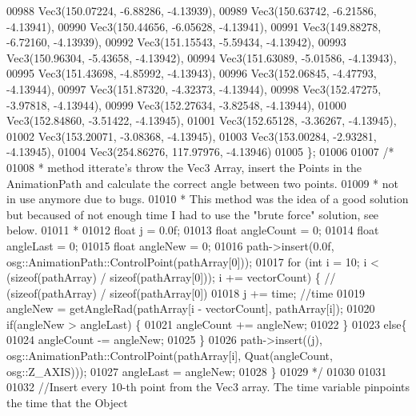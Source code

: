 \begin{DoxyCode}
00988         Vec3(150.07224, -6.88286, -4.13939),
00989         Vec3(150.63742, -6.21586, -4.13941),
00990         Vec3(150.44656, -6.05628, -4.13941),
00991         Vec3(149.88278, -6.72160, -4.13939),
00992         Vec3(151.15543, -5.59434, -4.13942),
00993         Vec3(150.96304, -5.43658, -4.13942),
00994         Vec3(151.63089, -5.01586, -4.13943),
00995         Vec3(151.43698, -4.85992, -4.13943),
00996         Vec3(152.06845, -4.47793, -4.13944),
00997         Vec3(151.87320, -4.32373, -4.13944),
00998         Vec3(152.47275, -3.97818, -4.13944),
00999         Vec3(152.27634, -3.82548, -4.13944),
01000         Vec3(152.84860, -3.51422, -4.13945),
01001         Vec3(152.65128, -3.36267, -4.13945),
01002         Vec3(153.20071, -3.08368, -4.13945),
01003         Vec3(153.00284, -2.93281, -4.13945),
01004         Vec3(254.86276, 117.97976, -4.13946)
01005     \};
01006 
01007     \textcolor{comment}{/*}
01008 \textcolor{comment}{     * method itterate's throw the Vec3 Array, insert the Points in the AnimationPath and calculate the
       correct angle between two points.}
01009 \textcolor{comment}{     * not in use anymore due to bugs.}
01010 \textcolor{comment}{     * This method was the idea of a good solution but becaused of not enough time I had to use the "brute
       force" solution, see below.}
01011 \textcolor{comment}{     * }
01012 \textcolor{comment}{    float j = 0.0f;}
01013 \textcolor{comment}{    float angleCount = 0;}
01014 \textcolor{comment}{    float angleLast = 0;}
01015 \textcolor{comment}{    float angleNew = 0;}
01016 \textcolor{comment}{    path->insert(0.0f, osg::AnimationPath::ControlPoint(pathArray[0]));}
01017 \textcolor{comment}{    for (int i = 10; i < (sizeof(pathArray) / sizeof(pathArray[0])); i += vectorCount) \{ //
      (sizeof(pathArray) / sizeof(pathArray[0])}
01018 \textcolor{comment}{        j += time; //time}
01019 \textcolor{comment}{        angleNew = getAngleRad(pathArray[i - vectorCount], pathArray[i]);}
01020 \textcolor{comment}{        if(angleNew > angleLast) \{}
01021 \textcolor{comment}{          angleCount += angleNew;}
01022 \textcolor{comment}{        \}}
01023 \textcolor{comment}{        else\{}
01024 \textcolor{comment}{          angleCount -= angleNew;}
01025 \textcolor{comment}{        \}}
01026 \textcolor{comment}{        path->insert((j), osg::AnimationPath::ControlPoint(pathArray[i], Quat(angleCount, osg::Z\_AXIS)));}
01027 \textcolor{comment}{        angleLast = angleNew;}
01028 \textcolor{comment}{    \}}
01029 \textcolor{comment}{    */}
01030    
01031     
01032     \textcolor{comment}{//Insert every 10-th point from the Vec3 array. The time variable pinpoints the time that the Object
}
\end{DoxyCode}
